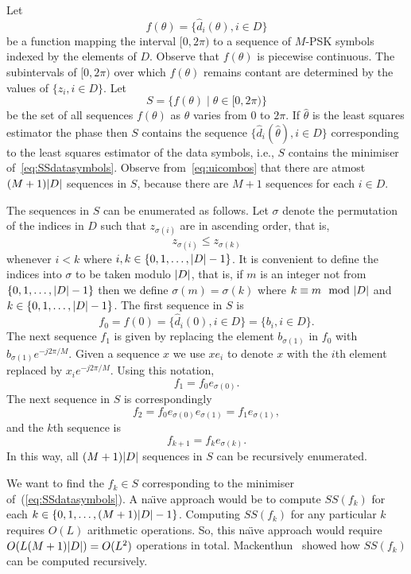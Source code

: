 \documentclass[journal]{IEEEtran}
\begin{document}
Let 
\[
f(\theta) = \{ \hat{d}_i(\theta), i \in D \}
\]
be a function mapping the interval $[0, 2\pi)$ to a sequence of $M$-PSK symbols indexed by the elements of $D$.  Observe that $f(\theta)$ is piecewise continuous.  The subintervals of $[0, 2\pi)$ over which $f(\theta)$ remains contant are determined by the values of $\{z_i, i \in D\}$.  Let
\[
S = \{ f(\theta) \mid \theta \in [0, 2 \pi) \}
\]
be the set of all sequences $f(\theta)$ as $\theta$ varies from $0$ to $2\pi$.  If $\hat{\theta}$ is the least squares estimator the phase then $S$ contains the sequence $\{ \hat{d}_i(\hat{\theta}), i \in D \}$ corresponding to the least squares estimator of the data symbols, i.e., $S$ contains the minimiser of~\eqref{eq:SSdatasymbols}.  Observe from~\eqref{eq:uicombos} that there are atmost $(M+1){\left\vert D \right\vert}$ sequences in $S$, because there are $M+1$ sequences for each $i \in D$.

The sequences in $S$ can be enumerated as follows.  Let $\sigma$ denote the permutation of the indices in $D$ such that $z_{\sigma(i)}$ are in ascending order, that is,
\begin{equation}\label{eq:sigmasortind}
z_{\sigma(i)} \leq z_{\sigma(k)}
\end{equation}
whenever $i < k $ where $i, k \in \{0, 1, \dots, {\left\vert D \right\vert}-1\}$.  It is convenient to define the indices into $\sigma$ to be taken modulo ${\left\vert D \right\vert}$, that is, if $m$ is an integer not from $\{0, 1, \dots, {\left\vert D \right\vert}-1\}$ then we define $\sigma(m) = \sigma(k)$ where $k \equiv m \mod \abs{D}$ and $k \in  \{0, 1, \dots, {\left\vert D \right\vert}-1\}$.  The first sequence in $S$ is 
\[
f_0 = f(0) = \{ \hat{d}_i(0), i \in D \} = \{ b_i, i \in D \}.
\]  
The next sequence $f_1$ is given by replacing the element $b_{\sigma(1)}$ in $f_0$ with $b_{\sigma(1)}e^{-j2\pi/M}$.  Given a sequence $x$ we use $x e_i$ to denote $x$ with the $i$th element replaced by $x_i e^{-j2\pi/M}$.  Using this notation,  
\[
f_1 = f_0 e_{\sigma(0)}.
\] 
The next sequence in $S$ is correspondingly 
\[
f_2 = f_0 e_{\sigma(0)} e_{\sigma(1)} = f_1 e_{\sigma(1)},
\]
and the $k$th sequence is
\begin{equation}\label{eq:fkrec}
f_{k+1} = f_{k} e_{\sigma(k)}.
\end{equation}
In this way, all $(M+1){\left\vert D \right\vert}$ sequences in $S$ can be recursively enumerated.

We want to find the $f_k \in S$ corresponding to the minimiser of~(\ref{eq:SSdatasymbols}).  A na\"{\i}ve approach would be to compute $SS(f_k)$ for each $k \in \{0,1,\dots,(M+1){\left\vert D \right\vert}-1\}$.  Computing $SS(f_k)$ for any particular $k$ requires $O(L)$ arithmetic operations.  So, this na\"{\i}ve approach would require $O(L (M+1) {\left\vert D \right\vert}) = O(L^2)$ operations in total.  Mackenthun~\cite{Mackenthun1994} showed how $SS(f_k)$ can be computed recursively.
\end{document}
